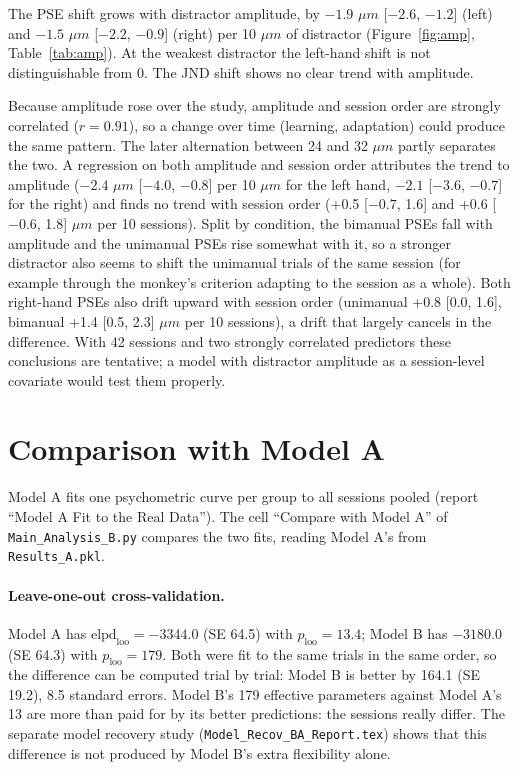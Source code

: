 \documentclass[11pt]{article}
\newcommand{\code}[1]{\texttt{#1}}
\begin{document}
The PSE shift grows with distractor amplitude, by $-1.9$ $\mu m$
[$-2.6$, $-1.2$] (left) and $-1.5$ $\mu m$ [$-2.2$, $-0.9$] (right) per 10 $\mu m$
of distractor (Figure~\ref{fig:amp}, Table~\ref{tab:amp}). At the weakest
distractor the left-hand shift is not distinguishable from 0. The JND shift shows
no clear trend with amplitude.

Because amplitude rose over the study, amplitude and session order are
strongly correlated ($r = 0.91$), so a change over time (learning, adaptation)
could produce the same pattern. The later alternation between 24 and 32 $\mu m$
partly separates the two. A regression on both amplitude and session order
attributes the trend to amplitude ($-2.4$ $\mu m$ [$-4.0$, $-0.8$] per
10 $\mu m$ for the left hand, $-2.1$ [$-3.6$, $-0.7$] for the right) and finds
no trend with session order (+0.5 [$-0.7$, 1.6] and +0.6 [$-0.6$, 1.8] $\mu m$
per 10 sessions). Split by condition, the bimanual PSEs fall with amplitude
and the unimanual PSEs rise somewhat with it, so a stronger distractor also
seems to shift the unimanual trials of the same session (for example through
the monkey's criterion adapting to the session as a whole). Both right-hand
PSEs also drift upward with session order (unimanual +0.8 [0.0, 1.6], bimanual
+1.4 [0.5, 2.3] $\mu m$ per 10 sessions), a drift that largely cancels in the
difference. With 42 sessions and
two strongly correlated predictors these conclusions are tentative; a model
with distractor amplitude as a session-level covariate would test them
properly.

\section{Comparison with Model A}
\label{sec:vs_A}

Model A fits one psychometric curve per group to all sessions pooled (report
``Model A Fit to the Real Data''). The cell ``Compare with Model A'' of
\code{Main\_Analysis\_B.py} compares the two fits, reading Model A's from
\code{Results\_A.pkl}.

\paragraph{Leave-one-out cross-validation.}
Model A has $\text{elpd}_\text{loo} = -3344.0$ (SE 64.5) with $p_\text{loo} = 13.4$;
Model B has $-3180.0$ (SE 64.3) with $p_\text{loo} = 179$. Both were fit to the same
trials in the same order, so the difference can be computed trial by trial: Model B
is better by 164.1 (SE 19.2), 8.5 standard errors. Model B's 179 effective
parameters against Model A's 13 are more than paid for by its better predictions:
the sessions really differ. The separate model recovery study
(\code{Model\_Recov\_BA\_Report.tex}) shows that this difference is not produced by
Model B's extra flexibility alone.
\end{document}
